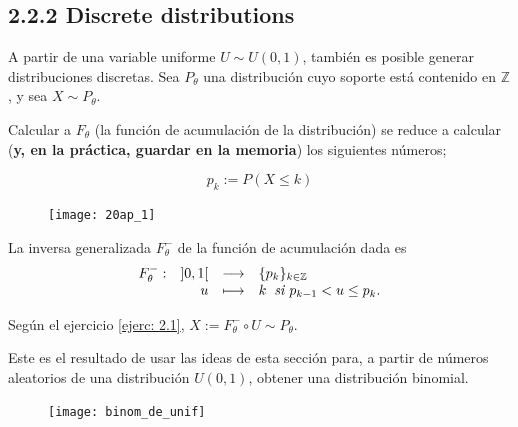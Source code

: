 \subsection{2.2.2 Discrete distributions}

A partir de una variable uniforme
$U \sim U(0,1)$, también es posible generar distribuciones
discretas. Sea $P_{\theta}$ una distribución cuyo 
soporte está contenido en $\mathbb{Z}$, y sea
$X \sim P_{\theta}$.


Calcular a $F_{\theta}$ (la función de acumulación
de la distribución) se reduce a calcular 
(\textbf{y, en la práctica, guardar en la memoria})
los siguientes números;

\begin{equation}
\label{eq0: 20Ap}
p_{k} := P(X \leq k)
\end{equation}

\begin{figure}[H]
	\centering
	\texttt{[image: 20ap\_1]} 
\end{figure}	

La inversa generalizada $F_{\theta}^{-}$ de la función
de acumulación dada es
\[
\text{${\begin{array}{crcl} F_{\theta}^{-}: & ]0,1[ & \longrightarrow & \{ p_{k} \}_{k \in \mathbb{Z}}  \\ \, & u & \longmapsto & 
k \hspace{0.2cm} \textit{si } p_{k-1} < u \leq p_{k}.
 \end{array}}$}
\]

Según el ejercicio \ref{ejerc: 2.1},
$X:= F^{-}_{\theta} \circ U \sim P_{\theta}$.

\begin{ej}
Este es el resultado de usar las ideas de esta sección para,
a partir de números aleatorios de una distribución
$U(0,1)$, obtener una distribución binomial.
\end{ej}
\begin{figure}[H]
	\centering
	\texttt{[image: binom\_de\_unif]} 
\end{figure}	

